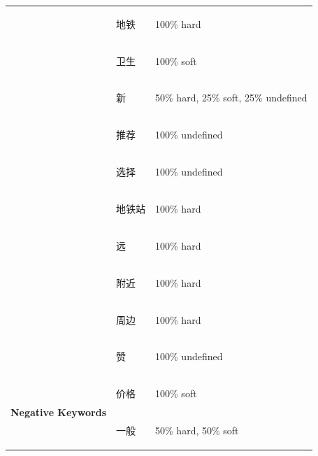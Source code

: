 \documentclass[smallextended,natbib]{svjour3}       %
\begin{document}
\begin{table}[ht]
{\begin{tabular}{|c|l|l|}
       & \begin{CJK}{UTF8}{gbsn}地铁\end{CJK}  & 100\% hard                           \\ \cline{2-3} 
       & \begin{CJK}{UTF8}{gbsn}卫生\end{CJK}  & 100\% soft                           \\ \cline{2-3} 
       & \begin{CJK}{UTF8}{gbsn}新\end{CJK}   & 50\% hard, 25\% soft, 25\% undefined \\ \cline{2-3} 
       & \begin{CJK}{UTF8}{gbsn}推荐\end{CJK}  & 100\% undefined                      \\ \cline{2-3} 
       & \begin{CJK}{UTF8}{gbsn}选择\end{CJK}  & 100\% undefined                      \\ \cline{2-3} 
       & \begin{CJK}{UTF8}{gbsn}地铁站\end{CJK} & 100\% hard                           \\ \cline{2-3} 
       & \begin{CJK}{UTF8}{gbsn}远\end{CJK}   & 100\% hard                           \\ \cline{2-3} 
       & \begin{CJK}{UTF8}{gbsn}附近\end{CJK}  & 100\% hard                           \\ \cline{2-3} 
       & \begin{CJK}{UTF8}{gbsn}周边\end{CJK}  & 100\% hard                           \\ \cline{2-3} 
       & \begin{CJK}{UTF8}{gbsn}赞\end{CJK}   & 100\% undefined                      \\ \hline
      \multirow{8}{*}{\textbf{Negative Keywords}}  & \begin{CJK}{UTF8}{gbsn}价格\end{CJK}    & 100\% soft                                       \\ \cline{2-3} 
       & \begin{CJK}{UTF8}{gbsn}一般\end{CJK}  & 50\% hard, 50\% soft                 \\ \cline{2-3} 

\end{tabular}}
\end{table}
\end{document}
